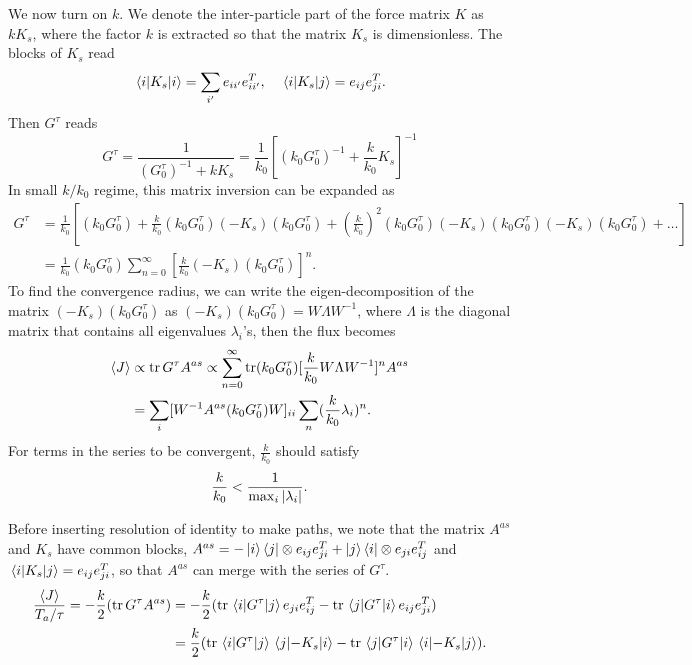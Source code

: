 \documentclass[
 amsmath,amssymb,
 aps,
 pre,
 longbibliography,
 10pt, onecolumn,
 notitlepage
]{revtex4-1}
\begin{document}
We now turn on $k$. We denote the inter-particle part of the force matrix $K$ as $k K_s$, where the factor $k$ is extracted so that the matrix $K_s$ is dimensionless. The blocks of $K_s$ read
\begin{equation} \label{eqnS:smallk_matKs}
    \mel{i}{K_s}{i} = \sum_{i'} e_{ii'}e_{ii'}^T, \quad
    \mel{i}{K_s}{j} = e_{ij}e_{ji}^T.
\end{equation}
Then $G^\tau$ reads
\begin{equation}
    G^\tau = \frac{1}{(G^\tau_0)^{-1} + k K_s}
    = \frac{1}{k_0} [(k_0 G^\tau_0)^{-1} + \frac{k}{k_0}K_s]^{-1}
\end{equation}
In small $k/k_0$ regime, this matrix inversion can be expanded as
\begin{equation} \label{eqnS:smallk_expand}
    \begin{split}
    G^\tau &= \frac{1}{k_0} [(k_0 G^\tau_0) + \frac{k}{k_0} (k_0 G^\tau_0) (-K_s) (k_0 G^\tau_0) + (\frac{k}{k_0})^2 (k_0 G^\tau_0) (-K_s) (k_0 G^\tau_0) (-K_s) (k_0 G^\tau_0) + \dots ]\\
    &= \frac{1}{k_0} (k_0 G^\tau_0) \sum_{n=0}^{\infty}[\frac{k}{k_0}(-K_s)(k_0 G^\tau_0)]^n.
    \end{split}
\end{equation}
To find the convergence radius, we can write the eigen-decomposition of the matrix $(-K_s)(k_0 G^\tau_0)$ as $(-K_s)(k_0 G^\tau_0) = W\Lambda W^{-1}$, where $\Lambda$ is the diagonal matrix that contains all eigenvalues $\lambda_i$'s, then the flux becomes
\begin{equation}
    \begin{split}
    \expval{J} &\propto \tr G^\tau A^{as}
    \propto \sum_{n=0}^{\infty}\tr (k_0 G^\tau_0) [\frac{k}{k_0}W\Lambda W^{-1}]^n A^{as} \\
    &= \sum_i [W^{-1} A^{as} (k_0 G^\tau_0) W]_{ii} \sum_n (\frac{k}{k_0} \lambda_i)^n.
    \end{split}
\end{equation}
For terms in the series to be convergent, $\frac{k}{k_0}$ should satisfy
\begin{equation} \label{eqnS:smallk_convergence}
    \frac{k}{k_0} < \frac{1}{\max_i\abs{\lambda_i}}.
\end{equation}

Before inserting resolution of identity to make paths, we note that the matrix $A^{as}$ and $K_s$ have common blocks, $A^{as} = -\ket{i}\bra{j} \otimes e_{ij}e_{ji}^T + \ket{j}\bra{i} \otimes e_{ji}e_{ij}^T$ and $\mel{i}{K_s}{j} = e_{ij}e_{ji}^T$, so that $A^{as}$ can merge with the series of $G^\tau$.
\begin{equation} \label{eqnS:smallk_J_block}
    \begin{split}
    \frac{\expval{J}}{T_a/\tau} = -\frac{k}{2} (\tr G^\tau A^{as})
    &= -\frac{k}{2} (\tr \mel{i}{G^\tau}{j} e_{ji}e_{ij}^T - \tr \mel{j}{G^\tau}{i} e_{ij}e_{ji}^T) \\
    &= \frac{k}{2} (\tr \mel{i}{G^\tau}{j} \mel{j}{-K_s}{i} - \tr \mel{j}{G^\tau}{i} \mel{i}{-K_s}{j}).
    \end{split}
\end{equation}
\end{document}
